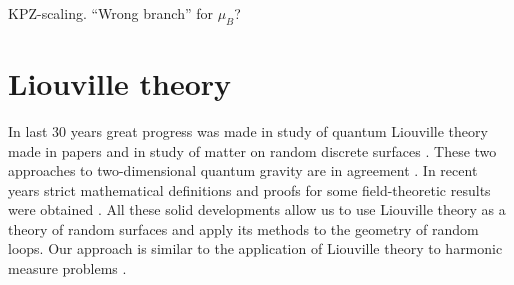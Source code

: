 \documentclass[12pt]{article}
\begin{document}
KPZ-scaling. ``Wrong branch'' for $\mu_{B}$? 


\section{Liouville theory}
\label{sec:liouville-theory}



In last 30 years great progress was made in study of quantum Liouville theory made in papers
\cite{fateev2000boundary,zamolodchikov1996conformal,knizhnik1988fractal} and in study of matter on
random discrete surfaces
\cite{kazakov1986ising,duplantier1990geometrical,gaudin1989n,duplantier1988conformal}. These two
approaches to two-dimensional quantum gravity are in agreement
\cite{kostov2004boundary,kostov2003boundary}. In recent years strict mathematical definitions and proofs for some
field-theoretic results were obtained \cite{duplantier2011liouville,garban2012quantum}. All these
solid developments allow us to use Liouville theory as a theory of random surfaces and apply its
methods to the geometry of random loops. Our approach is similar to the application of Liouville
theory to harmonic measure problems \cite{duplantier2000conformally}. 
\end{document}
